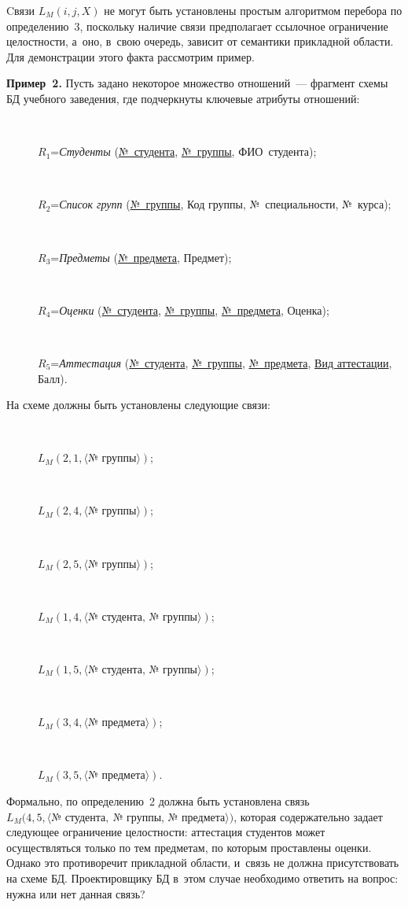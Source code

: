 \begin{multicols}{2}
  Cвязи $L_M(i,j,X)$ не могут быть установлены простым алгоритмом
перебора по определению~3, поскольку наличие связи предполагает ссылочное
ограничение целостности, а~оно, в~свою очередь, зависит от семантики
прикладной области. Для демонстрации этого факта рассмотрим пример.

  \smallskip

  \noindent
  \textbf{Пример~2.} Пусть задано некоторое множество отношений~---
фрагмент схемы БД учебного заведения, где подчеркнуты ключевые атрибуты
отношений:
\begin{description}
\item[\,]
  $R_1$\;=\;\textit{Студенты} (\underline{№~студента}, \underline{№~группы}, 
  ФИО~студента);

\item[\,]
  $R_2$\;=\;\textit{Список групп} (\underline{№~группы}, Код группы, №~специальности,
№~курса);
\item[\,]
  $R_3$\;=\;\textit{Предметы} (\underline{№~предмета}, Предмет);
\item[\,]
  $R_4$\;=\;\textit{Оценки} (\underline{№~студента}, 
  \underline{№~группы}, \underline{№~предмета}, Оценка);
\item[\,]
  $R_5$\;=\;\textit{Аттестация} (\underline{№~студента}, 
  \underline{№~группы}, \underline{№~предмета}, \underline{Вид
аттестации}, Балл).
\end{description}

  На схеме должны быть установлены следующие связи:
\begin{description}
\item[\,]  $L_M(2,1,\langle \mbox{№~группы}\rangle)$;
\item[\,]  $L_M(2,4,\langle \mbox{№~группы}\rangle)$;

\pagebreak


\item[\,] $L_M(2,5,\langle \mbox{№~группы}\rangle)$;
\item[\,] $L_M(1,4,\langle\mbox{№~студента,\ №~группы}\rangle)$;
\item[\,]  $L_M(1,5,\langle\mbox{№~студента,\ №~группы}\rangle)$;
\item[\,]  $L_M(3,4,\langle\mbox{№~предмета}\rangle)$;
\item[\,] $L_M(3,5,\langle\mbox{№~предмета}\rangle)$.
\end{description}

 Формально, по определению~2
должна быть уста\-нов\-ле\-на связь $L_M(4,5,\langle\mbox{№~студента},\
\mbox{№~группы}$, $\mbox{№~предмета}\rangle)$, которая содержательно задает следующее
ограничение целостности: аттестация студентов может осуществляться только
по тем предметам, по которым проставлены оценки. Однако это противоречит
прикладной области, и~связь не должна присутствовать на схеме БД.
Проектировщику БД в~этом случае необходимо ответить на вопрос: нужна или
нет данная связь?


\end{multicols}
